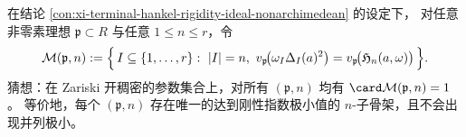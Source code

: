 \begin{conjecture}\label{conj:xi-nonarchimedean-minimizer-skeleton-uniqueness}
在结论 \ref{con:xi-terminal-hankel-rigidity-ideal-nonarchimedean} 的设定下，
对任意非零素理想 \(\mathfrak p\subset R\) 与任意 \(1\le n\le r\)，令
\[
\mathcal M(\mathfrak p,n)
:=\Bigl\{\,I\subseteq\{1,\dots,r\}:\ |I|=n,\ v_{\mathfrak p}\!\bigl(\omega_I\Delta_I(a)^2\bigr)=v_{\mathfrak p}\!\bigl(\mathfrak H_n(a,\omega)\bigr)\,\Bigr\}.
\]
猜想：在 Zariski 开稠密的参数集合上，对所有 \((\mathfrak p,n)\) 均有 \(\card\mathcal M(\mathfrak p,n)=1\)。
等价地，每个 \((\mathfrak p,n)\) 存在唯一的达到刚性指数极小值的 \(n\)-子骨架，且不会出现并列极小。
\end{conjecture}

